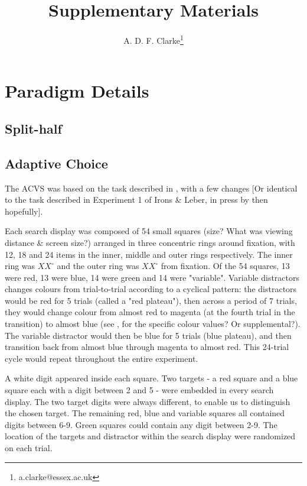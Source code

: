 \documentclass[a4paper, oneside, 11pt, onecolumn]{article}
\begin{document}
\title{Supplementary Materials}

\author{A. D. F. Clarke\thanks{a.clarke@essex.ac.uk}}

\maketitle

\begin{abstract}

\end{abstract}

\section{Paradigm Details}

\subsection{Split-half}

\subsection{Adaptive Choice}

The ACVS was based on the task described in \cite{irons-leber2016}, with a few changes [Or identical to the task described in Experiment 1 of Irons \& Leber, in press by then hopefully].

Each search display was composed of 54 small squares (size? What was viewing distance \& screen size?) arranged in three concentric rings around fixation, with 12, 18 and 24 items in the inner, middle and outer rings respectively. The inner ring was $XX^{\circ}$ and the outer ring was $XX^{\circ}$ from fixation. Of the 54 squares, 13 were red, 13 were blue, 14 were green and 14 were "variable". Variable distractors changes colours from trial-to-trial according to a cyclical pattern: the distractors would be red for 5 trials (called a "red plateau"), then across a period of 7 trials, they would change colour from almost red to magenta (at the fourth trial in the transition) to almost blue (see \cite{irons-leber2017}, for the specific colour values? Or supplemental?). The variable distractor would then be blue for 5 trials (blue plateau), and then transition back from almost blue through magenta to almost red. This 24-trial cycle would repeat throughout the entire experiment. 

A white digit appeared inside each square. Two targets - a red square and a blue square each with a digit between 2 and 5 - were embedded in every search display. The two target digits were always different, to enable us to distinguish the chosen target. The remaining red, blue and variable squares all contained digits between 6-9. Green squares could contain any digit between 2-9. The location of the targets and distractor within the search display were randomized on each trial.
\end{document}
